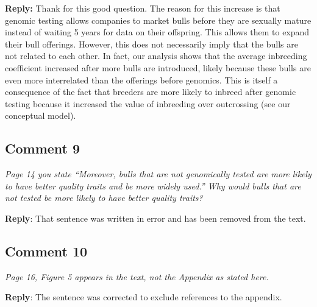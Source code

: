 \documentclass[12pt,letterpaper]{article}
\begin{document}
\textbf{Reply:} Thank for this good question. The reason for this increase is that genomic testing allows companies to market bulls before they are sexually mature instead of waiting 5 years for data on their offspring. This allows them to expand their bull offerings. However, this does not necessarily imply that the bulls are not related to each other. In fact, our analysis shows that the average inbreeding coefficient increased after more bulls are introduced, likely because these bulls are even more interrelated than the offerings before genomics. This is itself a consequence of the fact that breeders are more likely to inbreed after genomic testing because it increased the value of inbreeding over outcrossing (see our conceptual model).

\subsection*{Comment 9}
{\it Page 14 you state “Moreover, bulls that are not genomically tested are more likely to have better quality traits and be more widely used.”  Why would bulls that are not tested be more likely to have better quality traits?}

\textbf{Reply}: That sentence was written in error and has been removed from the text.

\subsection*{Comment 10}
{\it Page 16, Figure 5 appears in the text, not the Appendix as stated here.}

\textbf{Reply}: The sentence was corrected to exclude references to the appendix.

%
\printbibliography[title={References 3}]
\newrefsection
\end{document}

